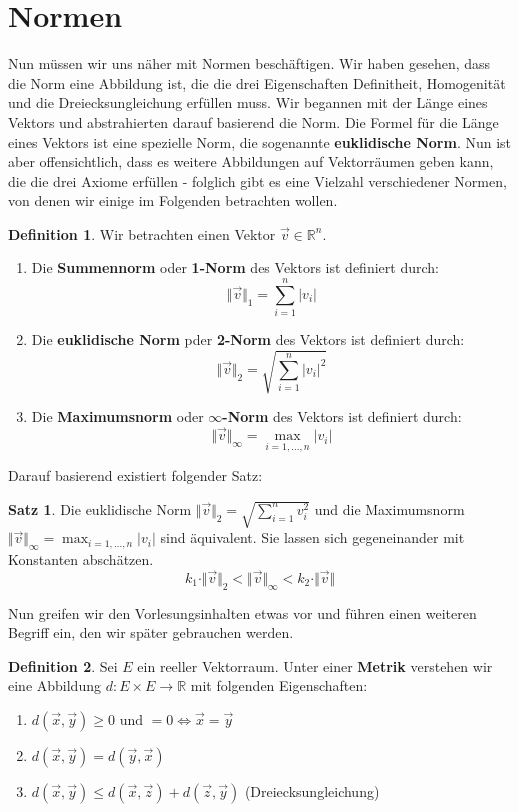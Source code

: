 \documentclass[11pt,a4paper]{scrartcl}
\theoremstyle{remark}
\theoremstyle{definition}
\newtheorem{definition}{Definition}[section]
\newtheorem{satz}{Satz}[section]
\begin{document}
\section{Normen}
Nun müssen wir uns näher mit Normen beschäftigen. Wir haben gesehen, dass die Norm eine Abbildung ist, die die drei Eigenschaften Definitheit, Homogenität und die Dreiecksungleichung erfüllen muss. Wir begannen mit der Länge eines Vektors und abstrahierten darauf basierend die Norm. Die Formel für die Länge eines Vektors ist eine spezielle Norm, die sogenannte \textbf{euklidische Norm}. Nun ist aber offensichtlich, dass es weitere Abbildungen auf Vektorräumen geben kann, die die drei Axiome erfüllen - folglich gibt es eine Vielzahl verschiedener Normen, von denen wir einige im Folgenden betrachten wollen.
\begin{definition} Wir betrachten einen Vektor $\vec{v} \in \mathbb{R}^n$.
\begin{enumerate}
\item Die \textbf{Summennorm} oder \textbf{1-Norm} des Vektors ist definiert durch: 
\[\Vert \vec{v} \Vert _{1} = \sum\limits_{i=1}^{n} \vert v_i \vert\]
\item Die \textbf{euklidische Norm} pder \textbf{2-Norm} des Vektors ist definiert durch:
\[\Vert \vec{v} \Vert _{2} = \sqrt{\sum\limits_{i=1}^{n} \vert v_i \vert ^{2}}\]
\item Die \textbf{Maximumsnorm} oder \textbf{$\infty$-Norm} des Vektors ist definiert durch:
\[\Vert \vec{v} \Vert _{\infty} = \max _{i=1, ..., n} \vert v_i \vert\]
\end{enumerate}
\end{definition}
Darauf basierend existiert folgender Satz:
\begin{satz}
Die euklidische Norm $\Vert \vec{v} \Vert _{2} = \sqrt{\sum\limits_{i=1}^{n} v_{i}^{2}}$ und die Maximumsnorm $\Vert \vec{v} \Vert _{\infty} = \max _{i=1, ..., n} \vert v_i \vert$ sind äquivalent. Sie lassen sich gegeneinander mit Konstanten abschätzen.
\[k_1 \cdot \Vert \vec{v} \Vert _{2} < \Vert \vec{v} \Vert _{\infty} < k_2 \cdot \Vert \vec{v} \Vert\]
\end{satz}
Nun greifen wir den Vorlesungsinhalten etwas vor und führen einen weiteren Begriff ein, den wir später gebrauchen werden.
\begin{definition}
Sei $E$ ein reeller Vektorraum. Unter einer \textbf{Metrik} verstehen wir eine Abbildung $d: E \times E \to \mathbb{R}$ mit folgenden Eigenschaften:
\begin{enumerate}
\item $d(\vec{x}, \vec{y}) \geq 0 \text{ und } = 0 \Leftrightarrow \vec{x} = \vec{y}$
\item $d(\vec{x}, \vec{y}) = d(\vec{y}, \vec{x})$
\item $d(\vec{x}, \vec{y}) \leq d(\vec{x}, \vec{z}) + d(\vec{z}, \vec{y})$ (Dreiecksungleichung)
\end{enumerate}
\end{definition}
\end{document}
